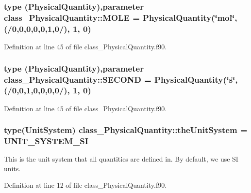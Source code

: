 \hypertarget{namespaceclass__PhysicalQuantity_a22a20ab491923015030051550a34c977}{
\subsubsection[{MOLE}]{\setlength{\rightskip}{0pt plus 5cm}type ({\bf PhysicalQuantity}),parameter {\bf class\_\-PhysicalQuantity::MOLE} = {\bf PhysicalQuantity}(\char`\"{}mol\char`\"{}, (/0,0,0,0,0,1,0/), 1, 0)}}
\label{namespaceclass__PhysicalQuantity_a22a20ab491923015030051550a34c977}


Definition at line 45 of file class\_\-PhysicalQuantity.f90.

\hypertarget{namespaceclass__PhysicalQuantity_a7fdf486aace5a1e99af5a634719bb9ce}{
\subsubsection[{SECOND}]{\setlength{\rightskip}{0pt plus 5cm}type ({\bf PhysicalQuantity}),parameter {\bf class\_\-PhysicalQuantity::SECOND} = {\bf PhysicalQuantity}(\char`\"{}s\char`\"{}, (/0,0,1,0,0,0,0/), 1, 0)}}
\label{namespaceclass__PhysicalQuantity_a7fdf486aace5a1e99af5a634719bb9ce}


Definition at line 45 of file class\_\-PhysicalQuantity.f90.

\hypertarget{namespaceclass__PhysicalQuantity_a61173098b2362361938556f5fb35431e}{
\subsubsection[{theUnitSystem}]{\setlength{\rightskip}{0pt plus 5cm}type({\bf UnitSystem}) {\bf class\_\-PhysicalQuantity::theUnitSystem} = UNIT\_\-SYSTEM\_\-SI}}
\label{namespaceclass__PhysicalQuantity_a61173098b2362361938556f5fb35431e}


This is the unit system that all quantities are defined in. By default, we use SI units. 



Definition at line 12 of file class\_\-PhysicalQuantity.f90.

